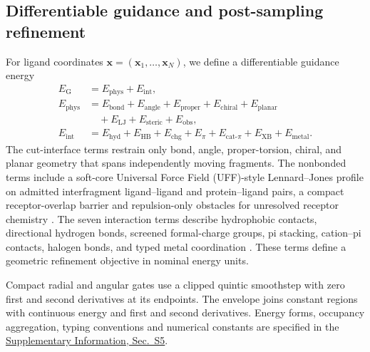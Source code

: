 \documentclass{article}
\newcommand{\citep}[1]{\cite{#1}}
\newcommand{\sisection}[1]{\href{SI.pdf}{Supplementary Information, Sec.~#1}}
\begin{document}
\FloatBarrier

\subsection{Differentiable guidance and post-sampling refinement}
\label{sec:guidance}

For ligand coordinates \(\mathbf{x}=(\mathbf{x}_1,\ldots,\mathbf{x}_N)\), we define a differentiable guidance energy
\begin{align}
    E_{\mathrm{G}}&=E_{\mathrm{phys}}+E_{\mathrm{int}},\nonumber\\
    E_{\mathrm{phys}}&=E_{\mathrm{bond}}+E_{\mathrm{angle}}+E_{\mathrm{proper}}
      +E_{\mathrm{chiral}}+E_{\mathrm{planar}}\nonumber\\
      &\quad+E_{\mathrm{LJ}}+E_{\mathrm{steric}}+E_{\mathrm{obs}},\nonumber\\
    E_{\mathrm{int}}&=E_{\mathrm{hyd}}+E_{\mathrm{HB}}+E_{\mathrm{chg}}
      +E_{\pi}+E_{\mathrm{cat}\text{-}\pi}+E_{\mathrm{XB}}+E_{\mathrm{metal}}.
    \label{eq:guidance_total}
\end{align}
The cut-interface terms restrain only bond, angle, proper-torsion, chiral, and planar geometry that spans independently moving fragments.
The nonbonded terms include a soft-core Universal Force Field (UFF)-style Lennard--Jones profile on admitted interfragment ligand--ligand and protein--ligand pairs, a compact receptor-overlap barrier and repulsion-only obstacles for unresolved receptor chemistry \citep{rappe1992uff}.
The seven interaction terms describe hydrophobic contacts, directional hydrogen bonds, screened formal-charge groups, pi stacking, cation--pi contacts, halogen bonds, and typed metal coordination \citep{salentin2015plip,mcgaughey1998pistacking,gallivan1999cationpi,desiraju2013halogen,dokmanic2008metals}.
These terms define a geometric refinement objective in nominal energy units.

Compact radial and angular gates use a clipped quintic smoothstep with zero first and second derivatives at its endpoints. The envelope joins constant regions with continuous energy and first and second derivatives. Energy forms, occupancy aggregation, typing conventions and numerical constants are specified in the \sisection{S5}.
\end{document}

